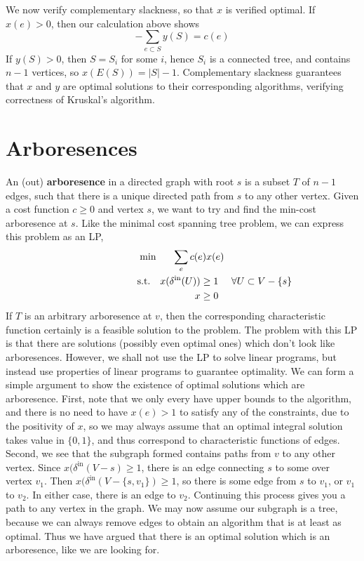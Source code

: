 We now verify complementary slackness, so that $x$ is verified optimal. If $x(e) > 0$, then our calculation above shows
%
\[ - \sum_{e \subset S} y(S) = c(e) \]
%
If $y(S) > 0$, then $S = S_i$ for some $i$, hence $S_i$ is a connected tree, and contains $n-1$ vertices, so $x(E(S)) = |S| - 1$. Complementary slackness guarantees that $x$ and $y$ are optimal solutions to their corresponding algorithms, verifying correctness of Kruskal's algorithm.

\section{Arboresences}

An (out) {\bf arboresence} in a directed graph with root $s$ is a subset $T$ of $n-1$ edges, such that there is a unique directed path from $s$ to any other vertex. Given a cost function $c \geq 0$ and vertex $s$, we want to try and find the min-cost arboresence at $s$. Like the minimal cost spanning tree problem, we can express this problem as an LP,
%
\begin{gather*}
\min \quad\ \ \sum_e c(e) x(e) \\
\begin{aligned}
\ \ \ \ \ \ \ \ \ \ \ \ \ \ \ \ \ \ \ \ \textup{s.t.} \quad x(\delta^{\text{in}}(U)) &\geq 1\ \ \ \ \forall U \subset V - \{ s \} \\
                  x &\geq 0
\end{aligned}
\end{gather*}
%
If $T$ is an arbitrary arboresence at $v$, then the corresponding characteristic function certainly is a feasible solution to the problem. The problem with this LP is that there are solutions (possibly even optimal ones) which don't look like arboresences. However, we shall not use the LP to solve linear programs, but instead use properties of linear programs to guarantee optimality. We can form a simple argument to show the existence of optimal solutions which are arboresence. First, note that we only every have upper bounds to the algorithm, and there is no need to have $x(e) > 1$ to satisfy any of the constraints, due to the positivity of $x$, so we may always assume that an optimal integral solution takes value in $\{ 0, 1 \}$, and thus correspond to characteristic functions of edges. Second, we see that the subgraph formed contains paths from $v$ to any other vertex. Since $x(\delta^{\text{in}}(V - s) \geq 1$, there is an edge connecting $s$ to some over vertex $v_1$. Then $x(\delta^{\text{in}}(V - \{ s, v_1 \}) \geq 1$, so there is some edge from $s$ to $v_1$, or $v_1$ to $v_2$. In either case, there is an edge to $v_2$. Continuing this process gives you a path to any vertex in the graph. We may now assume our subgraph is a tree, because we can always remove edges to obtain an algorithm that is at least as optimal. Thus we have argued that there is an optimal solution which is an arboresence, like we are looking for.


